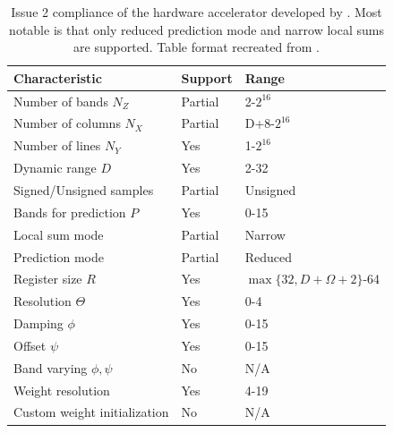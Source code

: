 \begin{table}[h]
	\centering
	\caption{Issue 2 compliance of the hardware accelerator developed by \citeauthor{vorhaugHyperspectralImageCompression2024}. Most notable is that only reduced prediction mode and narrow local sums are supported. Table format recreated from \cite{basconesRealTimeFPGAImplementation2022}.}
	\label{tab:compliance}
	\begin{tabular}{lll}
		\hline
		\textbf{Characteristic}                 & \textbf{Support} & \textbf{Range}              \\
		\hline
		Number of bands $N_Z$                   & Partial          & 2-$2^{16}$                  \\
		Number of columns $N_X$                 & Partial          & D+8-$2^{16}$                \\
		Number of lines $N_Y$                   & Yes              & 1-$2^{16}$                  \\
		Dynamic range $D$                       & Yes              & 2-32                        \\
		Signed/Unsigned samples                 & Partial          & Unsigned                    \\
		Bands for prediction $P$                & Yes              & 0-15                        \\
		Local sum mode                          & Partial          & Narrow                      \\
		Prediction mode                         & Partial          & Reduced                     \\
		Register size $R$                       & Yes              & $\max\{32, D+\Omega+2\}$-64 \\
		Resolution $\Theta$                     & Yes              & 0-4                         \\
		Damping $\phi$                          & Yes              & 0-15                        \\
		Offset $\psi$                           & Yes              & 0-15                        \\
		Band varying $\phi,\psi$                & No               & N/A                         \\
		Weight resolution                       & Yes              & 4-19                        \\
		Custom weight initialization            & No               & N/A                         \\

\end{tabular}
\end{table}
